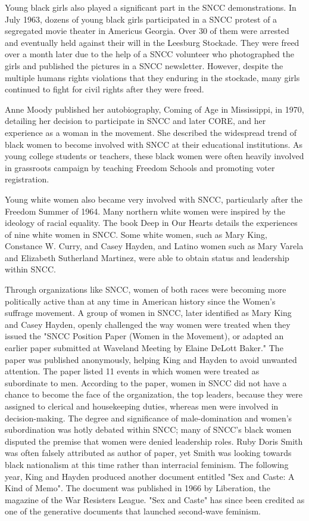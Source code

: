 Young black girls also played a significant part in the SNCC
demonstrations. In July 1963, dozens of young black girls participated
in a SNCC protest of a segregated movie theater in Americus Georgia.
Over 30 of them were arrested and eventually held against their will in
the Leesburg Stockade. They were freed over a month later due to the
help of a SNCC volunteer who photographed the girls and published the
pictures in a SNCC newsletter. However, despite the multiple humans
rights violations that they enduring in the stockade, many girls
continued to fight for civil rights after they were freed.

Anne Moody published her autobiography, Coming of Age in Mississippi, in
1970, detailing her decision to participate in SNCC and later CORE, and
her experience as a woman in the movement. She described the widespread
trend of black women to become involved with SNCC at their educational
institutions. As young college students or teachers, these black women
were often heavily involved in grassroots campaign by teaching Freedom
Schools and promoting voter registration.

Young white women also became very involved with SNCC, particularly
after the Freedom Summer of 1964. Many northern white women were
inspired by the ideology of racial equality. The book Deep in Our Hearts
details the experiences of nine white women in SNCC. Some white women,
such as Mary King, Constance W. Curry, and Casey Hayden, and Latino
women such as Mary Varela and Elizabeth Sutherland Martinez, were able
to obtain status and leadership within SNCC.

Through organizations like SNCC, women of both races were becoming more
politically active than at any time in American history since the
Women's suffrage movement. A group of women in SNCC, later identified as
Mary King and Casey Hayden, openly challenged the way women were treated
when they issued the "SNCC Position Paper (Women in the Movement), or
adapted an earlier paper submitted at Waveland Meeting by Elaine DeLott
Baker." The paper was published anonymously, helping King and Hayden to
avoid unwanted attention. The paper listed 11 events in which women were
treated as subordinate to men. According to the paper, women in SNCC did
not have a chance to become the face of the organization, the top
leaders, because they were assigned to clerical and housekeeping duties,
whereas men were involved in decision-making. The degree and
significance of male-domination and women's subordination was hotly
debated within SNCC; many of SNCC's black women disputed the premise
that women were denied leadership roles. Ruby Doris Smith was often
falsely attributed as author of paper, yet Smith was looking towards
black nationalism at this time rather than interracial feminism. The
following year, King and Hayden produced another document entitled "Sex
and Caste: A Kind of Memo". The document was published in 1966 by
Liberation, the magazine of the War Resisters League. "Sex and Caste"
has since been credited as one of the generative documents that launched
second-wave feminism.

